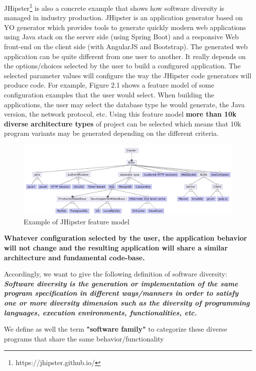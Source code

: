 JHipster\footnote{https://jhipster.github.io/} is also a concrete example that shows how software diversity is managed in industry production. JHipster is an application generator based on YO generator which provides tools to generate quickly modern web applications using Java stack on the server side (using Spring Boot) and a responsive Web front-end on the client side (with AngularJS and Bootstrap).
The generated web application can be quite different from one user to another. It really depends on the options/choices selected by the user to build a configured application. The selected parameter values will configure the way the JHipster code generators will produce code. 
For example, Figure 2.1 shows a feature model of some configuration examples that the user would select. When building the applications, the user may select the database type he would generate, the Java version, the network protocol, etc. 
Using this feature model \textbf{more than 10k diverse architecture types} of project can be selected which means that 10k program variants may be generated depending on the different criteria.
\begin{figure}[h]
	\center
	\includegraphics[scale=0.65]{Background/fig/jhipster}
	\caption{Example of JHipster feature model}
\end{figure}

\textbf{Whatever configuration selected by the user, the application behavior will not change and the resulting application will share a similar architecture and fundamental code-base.}

Accordingly, we want to give the following definition of software diversity: 
\textit{\textbf{Software diversity is the generation or implementation of the same program specification in different ways/manners in order to satisfy one or more diversity dimension such as the diversity of programming languages, execution environments, functionalities, etc. }}
		
We define as well the term \textbf{"software family"} to categorize these diverse programs that share the same behavior/functionality

